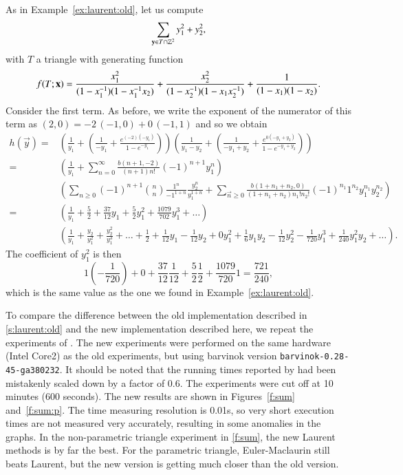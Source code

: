 \begin{example}
As in Example~\ref{ex:laurent:old}, let us compute
$$
\sum_{\vec y \in T\cap \ZZ^2} y_1^2 + y_2^2
,
$$
with $T$ a triangle with generating function
$$
\f T x =
\frac{x_1^2}{(1-x_1^{-1})(1-x_1^{-1}x_2)}
+
\frac{x_2^2}{(1-x_2^{-1})(1-x_1 x_2^{-1})}
+
\frac1{(1-x_1)(1-x_2)}
.
$$
Consider the first term.  As before, we write the exponent of
the numerator of this term as
$(2,0) = -2 \, (-1,0) + 0 \, (-1, 1)$ and so we obtain
\begin{align*}
h(\vec y)
=&
\left(
\frac 1{y_1}
+ \left(
\frac 1{-y_1}
+
\frac {e^{(-2)(-y_1)}}{1-e^{-y_1}}
\right)
\right)
\left(
\frac 1{y_1-y_2}
+ \left(
\frac 1{-y_1+y_2}
+
\frac {e^{0(-y_1+y_2)}}{1-e^{-y_1+y_2}}
\right)
\right)
\\
=&
\left(
\frac 1 {y_1} + \sum_{n=0}^{\infty} \frac{b(n+1,-2)}{(n+1)n!} (-1)^{n+1} y_1^n
\right)
\\
&
\left(
\sum_{n\ge 0} (-1)^{n+1} {n \choose n} \frac {1^n}{{-1}^{1+n}}
					\frac {y_2^{n}}{y_1^{1+n}}
+ \sum_{\vec n \ge 0} \frac{b(1+n_1+n_2,0)}{(1+n_1+n_2)n_1!n_2!}
	(-1)^{n_1} 1^{n_2} y_1^{n_1} y_2^{n_2}
\right)
\\
=&
\left(
\frac 1 {y_1} + \frac 5 2 + \frac {37}{12} y_1 + \frac 5 2 y_1^2
+ \frac {1079}{702} y_1^3 + \ldots
\right)
\\
&
\left(
\frac 1 {y_1} + \frac {y_2}{y_1^2} + \frac {y_2^2}{y_1^3} + \ldots
+
\frac 1 2
+ \frac 1 {12} y_1
- \frac 1 {12} y_2
+ 0 y_1^2
+ \frac 1 6 y_1 y_2
- \frac 1 {12} y_2^2
- \frac 1 {720} y_1^3
+ \frac 1 {240} y_1^2 y_2
+ \ldots
\right)
.
\end{align*}
The coefficient of $y_1^2$ is then
$$
1(-\frac 1 {720}) + 0 + \frac{37}{12}\frac 1{12} + \frac 5 2\frac 1 2
+ \frac{1079}{720} 1 = \frac{721}{240}
,
$$
which is the same value as the one we found in
Example~\ref{ex:laurent:old}.
\end{example}

To compare the difference between the old implementation described
in \autoref{s:laurent:old} and the new implementation described here,
we repeat the experiments of .
The new experiments were performed on the same hardware (Intel Core2)
as the old experiments, but using barvinok version
{\tt barvinok-0.28-45-ga380232}.
It should be noted that the running times reported by
 had been mistakenly scaled down
by a factor of $0.6$.
The experiments were cut off at 10 minutes (600 seconds).
The new results are shown in Figures~\ref{f:sum} and~\ref{f:sum:p}.
The time measuring resolution is 0.01s, so very short execution times are not
measured very accurately, resulting in some anomalies in the graphs.
In the non-parametric triangle experiment in \autoref{f:sum},
the new Laurent methods is by far the best.
For the parametric triangle, Euler-Maclaurin still beats Laurent,
but the new version is getting much closer than the old version.

